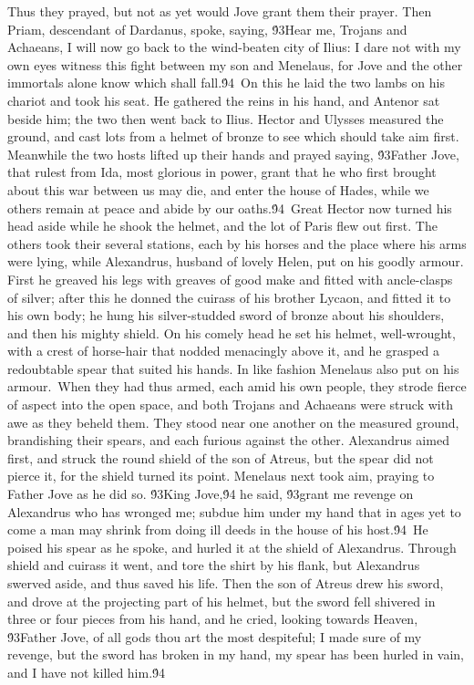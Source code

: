 {Thus they prayed, but not as yet would Jove grant them their prayer. Then Priam, descendant of Dardanus, spoke, saying, \'93Hear me, Trojans and Achaeans, I will now go back to the wind-beaten city of Ilius: I dare not with my own eyes witness this fight between my son and Menelaus, for Jove and the other immortals alone know which shall fall.\'94\
On this he laid the two lambs on his chariot and took his seat. He gathered the reins in his hand, and Antenor sat beside him; the two then went back to Ilius. Hector and Ulysses measured the ground, and cast lots from a helmet of bronze to see which should take aim first. Meanwhile the two hosts lifted up their hands and prayed saying, \'93Father Jove, that rulest from Ida, most glorious in power, grant that he who first brought about this war between us may die, and enter the house of Hades, while we others remain at peace and abide by our oaths.\'94\
Great Hector now turned his head aside while he shook the helmet, and the lot of Paris flew out first. The others took their several stations, each by his horses and the place where his arms were lying, while Alexandrus, husband of lovely Helen, put on his goodly armour. First he greaved his legs with greaves of good make and fitted with ancle-clasps of silver; after this he donned the cuirass of his brother Lycaon, and fitted it to his own body; he hung his silver-studded sword of bronze about his shoulders, and then his mighty shield. On his comely head he set his helmet, well-wrought, with a crest of horse-hair that nodded menacingly above it, and he grasped a redoubtable spear that suited his hands. In like fashion Menelaus also put on his armour.\
When they had thus armed, each amid his own people, they strode fierce of aspect into the open space, and both Trojans and Achaeans were struck with awe as they beheld them. They stood near one another on the measured ground, brandishing their spears, and each furious against the other. Alexandrus aimed first, and struck the round shield of the son of Atreus, but the spear did not pierce it, for the shield turned its point. Menelaus next took aim, praying to Father Jove as he did so. \'93King Jove,\'94 he said, \'93grant me revenge on Alexandrus who has wronged me; subdue him under my hand that in ages yet to come a man may shrink from doing ill deeds in the house of his host.\'94\
He poised his spear as he spoke, and hurled it at the shield of Alexandrus. Through shield and cuirass it went, and tore the shirt by his flank, but Alexandrus swerved aside, and thus saved his life. Then the son of Atreus drew his sword, and drove at the projecting part of his helmet, but the sword fell shivered in three or four pieces from his hand, and he cried, looking towards Heaven, \'93Father Jove, of all gods thou art the most despiteful; I made sure of my revenge, but the sword has broken in my hand, my spear has been hurled in vain, and I have not killed him.\'94\
}
